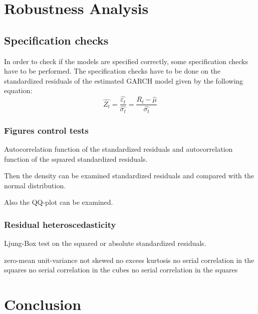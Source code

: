 \documentclass[a4paper, twoside]{templates/ociamthesis}
\begin{document}
\hypertarget{Robustness}{%
\chapter{Robustness Analysis}\label{Robustness}}

\minitoc 

\hypertarget{specification-checks}{%
\section{Specification checks}\label{specification-checks}}

In order to check if the models are specified correctly, some specification checks have to be performed. The specification checks have to be done on the standardized residuals of the estimated GARCH model given by the following equation:
\[ 
\hat{Z_t} = \dfrac{\hat{\varepsilon_t}}{\hat{\sigma_t}} = \dfrac{R_t - \hat{\mu}}{\hat{\sigma_t}}
\]

\hypertarget{figures-control-tests}{%
\subsection{Figures control tests}\label{figures-control-tests}}

Autocorrelation function of the standardized residuals and autocorrelation function of the squared standardized residuals.

Then the density can be examined standardized residuals and compared with the normal distribution.

Also the QQ-plot can be examined.

\hypertarget{residual-heteroscedasticity}{%
\subsection{Residual heteroscedasticity}\label{residual-heteroscedasticity}}

Ljung-Box test on the squared or absolute standardized residuals.

zero-mean
unit-variance
not skewed
no excess kurtosis
no serial correlation in the squares
no serial correlation in the cubes
no serial correlation in the squares

\hypertarget{Conclusion}{%
\chapter{Conclusion}\label{Conclusion}}

\startappendices
\end{document}
